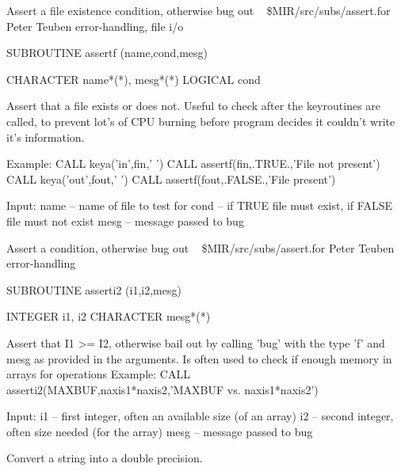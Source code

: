%
\noindent Assert a file existence condition, otherwise bug out
\newline \ 
\newline {} \$MIR/src/subs/assert.for
\newline {} Peter Teuben
\newline {} error-handling, file i/o
\par{\tenpoint
{\eightpoint\begintt
        SUBROUTINE assertf (name,cond,mesg)

        CHARACTER name*(*), mesg*(*)
        LOGICAL   cond

   Assert that a file exists or does not. Useful to check after
   the keyroutines are called, to prevent lot's of CPU burning
   before program decides it couldn't write it's information.

   Example:
       CALL keya('in',fin,' ')
       CALL assertf(fin,.TRUE.,'File not present')
       CALL keya('out',fout,' ')
       CALL assertf(fout,.FALSE.,'File present')

   Input:
       name  -- name of file to test for
       cond  -- if TRUE file must exist, if FALSE file must not exist
       mesg  -- message passed to bug
\endtt}
\par}
%
\noindent Assert a condition, otherwise bug out
\newline \ 
\newline {} \$MIR/src/subs/assert.for
\newline {} Peter Teuben
\newline \abox{Keywords:} error-handling
\par{\tenpoint
{\eightpoint\begintt
        SUBROUTINE asserti2 (i1,i2,mesg)

        INTEGER   i1, i2
        CHARACTER mesg*(*)

   Assert that I1 >= I2, otherwise bail out by calling
   'bug' with the type 'f' and mesg as provided in the arguments.
   Is often used to check if enough memory in arrays for operations
   Example:
       CALL asserti2(MAXBUF,naxis1*naxis2,'MAXBUF vs. naxis1*naxis2')

   Input:
       i1      -- first integer, often an available size (of an array)
       i2      -- second integer, often size needed (for the array)
       mesg    -- message passed to bug
\endtt}
\par}
%
\noindent Convert a string into a double precision.
\newline \ 
